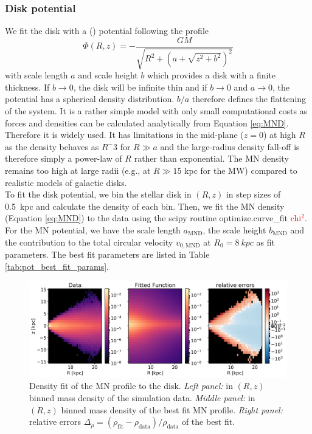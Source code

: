 \begin{figure}[htbp]
\begin{subfigure}[c]{0.45\textwidth}
    \end{subfigure}
    \label{fig:disk_spheroid_dist}
\end{figure}
\subsubsection{Disk potential}\label{subsubsec:disk_pot}
We fit the disk with a \citet{MNprofile} () potential following the profile 
\begin{equation}\label{eq:MND}
\Phi(R,z) = -\frac{GM}{\sqrt{R^2+(a+\sqrt{z^2+b^2})^2}}
\end{equation} 
with scale length $a$ and scale height $b$ which provides a disk with a finite thickness. If $b\rightarrow 0$, the disk will be infinite thin and if $b\rightarrow 0$ and $a \rightarrow 0$, the potential has a spherical density distribution. $b/a$ therefore defines the flattening of the system. It is a rather simple model with only small computational costs as forces and densities can be calculated analytically from Equation \ref{eq:MND}. Therefore it is widely used. It has limitations in the mid-plane ($z=0$) at high $R$ as the density behaves as $R^−3$ for $R\gg a$ and the large-radius density fall-off is therefore simply a power-law of $R$ rather than exponential. The \ac{MN} density remains too high at large radii (e.g., at $R\gg15$ kpc for the \ac{MW}) compared to realistic models of galactic disks. 
\\To fit the disk potential, we bin the stellar disk in $(R, z)$ in step sizes of \SI{0.5}{kpc} and calculate the density of each bin. Then, we fit the \ac{MN} density (Equation \ref{eq:MND}) to the data using the scipy \citep{scipy....2001} routine optimize.curve\_fit \textcolor{red}{chi$^2$}. For the \ac{MN} potential, we have the scale length $a_{\mathrm{MND}}$, the scale height $b_{\mathrm{MND}}$ and the contribution to the total circular velocity $v_{0, \mathrm{MND}}$ at $ R_0 = \SI{8}{kpc}$ as fit parameters. The best fit parameters are listed in Table \ref{tab:pot_best_fit_params}.
\begin{figure}[htbp]
\captionsetup{format=plain}
    \centering
    \includegraphics[width = \textwidth]{plots/Auriga/MND_best_fit_snap_127.png}
    \caption{Density fit of the \ac{MN} profile to the disk. \textit{Left panel:} in $(R,z)$ binned mass density of the simulation data. \textit{Middle panel:} in $(R,z)$ binned mass density of the best fit \ac{MN} profile. \textit{Right panel:} relative errors \(\Delta_\rho = (\rho_{\mathrm{fit}}- \rho_{\mathrm{data}})/\rho_{\mathrm{data}}\) of the best fit.}
    \label{fig:MND}
\end{figure}
